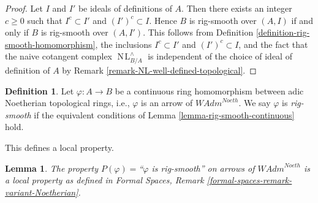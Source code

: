 \documentclass{stacks-project}
\theoremstyle{plain}
\newtheorem{lemma}[subsection]{Lemma}
\theoremstyle{definition}
\newtheorem{definition}[subsection]{Definition}
\theoremstyle{remark}
\numberwithin{equation}{subsection}
\def\NL{\mathop{N\!L}\nolimits}
\begin{document}
\begin{proof}
Let $I$ and $I'$ be ideals of definitions of $A$. Then there exists an
integer $c \geq 0$ such that $I^c \subset I'$ and $(I')^c \subset I$. Hence
$B$ is rig-smooth over $(A, I)$ if and only if
$B$ is rig-smooth over $(A, I')$. This follows from
Definition \ref{definition-rig-smooth-homomorphism},
the inclusions $I^c \subset I'$ and $(I')^c \subset I$, and
the fact that the naive cotangent complex $\NL_{B/A}^\wedge$
is independent of the choice of ideal of definition of $A$ by
Remark \ref{remark-NL-well-defined-topological}.
\end{proof}

\begin{definition}
\label{definition-rig-smooth-continuous-homomorphism}
Let $\varphi : A \to B$ be a continuous ring homomorphism
between adic Noetherian topological rings, i.e., $\varphi$
is an arrow of $\textit{WAdm}^{Noeth}$. We say
$\varphi$ is {\it rig-smooth} if the equivalent conditions
of Lemma \ref{lemma-rig-smooth-continuous} hold.
\end{definition}

\noindent
This defines a local property.

\begin{lemma}
\label{lemma-rig-smooth-axioms}
The property $P(\varphi)=$``$\varphi$ is rig-smooth'' on arrows
of $\textit{WAdm}^{Noeth}$ is a local property as defined in
Formal Spaces, Remark \ref{formal-spaces-remark-variant-Noetherian}.
\end{lemma}
\end{document}
